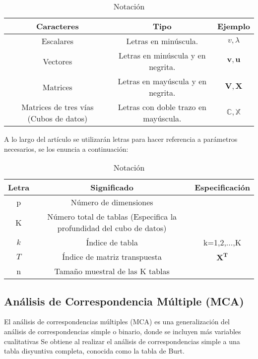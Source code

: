 \documentclass[water,article,submit,moreauthors,pdftex]{mdpi}
\begin{document}
\begin{table}[!ht]
\begin{center}
 \begin{tabular}{||c ||c |c ||} 
 \hline
 Caracteres & Tipo & Ejemplo \\
 \hline\hline
 Escalares & Letras en minúscula. & $v,\lambda$\\
\hline
Vectores & Letras en minúscula y en negrita. & $\mathbf{v},\mathbf{u}$\\
\hline
Matrices & Letras en mayúscula y en negrita. & $\mathbf{V},\mathbf{X}$\\
\hline
Matrices de tres vías (Cubos de datos) & Letras con doble trazo en mayúscula. & $\mathbb{C},\mathbb{X}$\\
\hline
\end{tabular}\caption{Notación}
\label{tab:notacion}
\end{center}
\end{table}

A lo largo del artículo se utilizarán letras para hacer referencia a
parámetros necesarios, se los enuncia a continuación:

\begin{table}[!ht]
\begin{center}
 \begin{tabular}{||c ||c | c ||} 
 \hline
 Letra &  Significado & Especificación\\
 \hline\hline
 p & Número de dimensiones &\\
\hline
 K & Número total de tablas (Especifica la profundidad del cubo de datos) & \\
 \hline
 $k$ & Índice de tabla &  k=1,2,...,K\\
  \hline
 $T$ & Índice de matriz transpuesta &  $\mathbf{X^{T}}$\\
\hline
 n & Tamaño muestral de las K tablas &\\
\hline
\end{tabular}\caption{Notación}
\label{tab:notacion}
\end{center}
\end{table}

\hypertarget{anuxe1lisis-de-correspondencia-muxfaltiple-mca}{%
\subsection{Análisis de Correspondencia Múltiple
(MCA)}\label{anuxe1lisis-de-correspondencia-muxfaltiple-mca}}

El análisis de correspondencias múltiples (MCA) es una generalización
del análisis de correspondencias simple o binario, donde se incluyen más
variables cualitativas Se obtiene al realizar el análisis de
correspondencias simple a una tabla disyuntiva completa, conocida como
la tabla de Burt.
\end{document}
